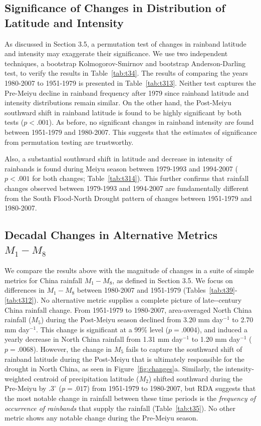 \documentclass{ametsoc}
\begin{document}
\subsection{Significance of Changes in Distribution of Latitude and Intensity}

	As discussed in Section 3.5, a permutation test of changes in rainband latitude and intensity may exaggerate their significance. We use two independent techniques, a bootstrap Kolmogorov-Smirnov and bootstrap Anderson-Darling test, to verify the results in Table~\ref{tab:t34}. The results of comparing the years 1980-2007 to 1951-1979 is presented in Table~\ref{tab:t313}. Neither test captures the Pre-Meiyu decline in rainband frequency after 1979 since rainband latitude and intensity distributions remain similar. On the other hand, the Post-Meiyu southward shift in rainband latitude is found to be highly significant by both tests ($p<.001$). As before, no significant changes in rainband intensity are found between 1951-1979 and 1980-2007. This suggests that the estimates of significance from permutation testing are trustworthy.

	Also, a substantial southward shift in latitude and decrease in intensity of rainbands is found during Meiyu season between 1979-1993 and 1994-2007 ($p<.001$ for both changes; Table~\ref{tab:t314}). This further confirms that rainfall changes observed between 1979-1993 and 1994-2007 are fundamentally different from the South Flood-North Drought pattern of changes between 1951-1979 and 1980-2007.

\subsection{Decadal Changes in Alternative Metrics $M_1-M_8$}

	We compare the results above with the magnitude of changes in a suite of simple metrics for China rainfall $M_1-M_8$, as defined in Section 3.5. We focus on differences in $M_1-M_8$ between 1980-2007 and 1951-1979 (Tables~\ref{tab:t39}-\ref{tab:t312}). No alternative metric supplies a complete picture of late--century China rainfall change. From 1951-1979 to 1980-2007, area-averaged North China rainfall ($M_5$) during the Post-Meiyu season declined from 3.20 mm day$^{-1}$ to 2.70 mm day$^{-1}$. This change is significant at a 99\% level ($p=.0004$), and induced a yearly decrease in North China rainfall from 1.31 mm day$^{-1}$ to 1.20 mm day$^{-1}$  ($p=.0068$). However, the change in $M_5$ fails to capture the southward shift of rainband latitude during the Post-Meiyu that is ultimately responsible for the drought in North China, as seen in Figure~\ref{fig:changes}a. Similarly, the intensity-weighted centroid of precipitation latitude ($M_2$) shifted southward during the Pre-Meiyu by $.3^\circ$ ($p=.017$) from 1951-1979 to 1980-2007, but RDA suggests that the most notable change in rainfall between these time periods is the \textit{frequency of occurrence of rainbands} that supply the rainfall (Table~\ref{tab:t35}). No other metric shows any notable change during the Pre-Meiyu season. 
	
\end{document}
